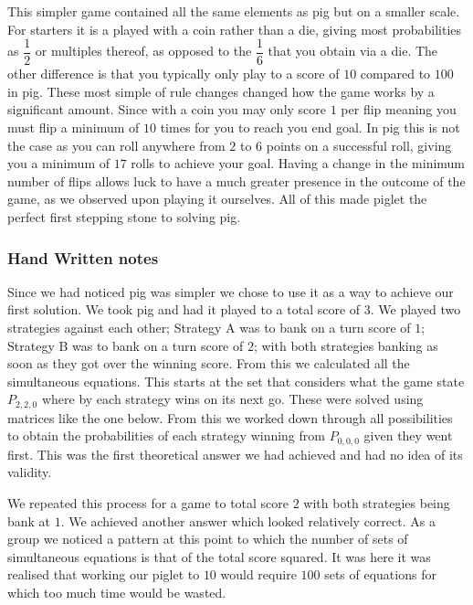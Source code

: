 \documentclass[a4paper,titlepage]{article}
\begin{document}
This simpler game contained all the same elements as pig but on a smaller scale. For starters it is a played with a coin rather than a die,
giving most probabilities as $\dfrac{1}{2}$ or multiples thereof, as opposed to the $\dfrac{1}{6}$ that you obtain via a die.
The other difference is that you typically only play to a score of $10$ compared to $100$ in pig.
These most simple of rule changes changed how the game works by a significant amount. %
Since with a coin you may only score $1$ per flip meaning you must flip a minimum of $10$ times for you to reach you end goal. In pig this is not the case as you can roll anywhere from $2$ to $6$ points on a successful roll, giving you a minimum of $17$ rolls to achieve your goal. Having a change in the minimum number of flips allows luck to have a much greater presence in the outcome of the game, as we observed upon playing it ourselves. All of this made piglet the perfect first stepping stone to solving pig.

\subsubsection{Hand Written notes}
Since we had noticed pig was simpler we chose to use it as a way to achieve our first solution. We took pig and had it played to a total score of $3$. We played two strategies against each other; Strategy A was to bank on a turn score of $1$; Strategy B was to bank on a turn score of $2$; with both strategies banking as soon as they got over the winning score. From this we calculated all the simultaneous equations. This starts at the set that considers what the game state $P_{2,2,0}$ where by each strategy wins on its next go. These were solved using matrices like the one below.
From this we worked down through all possibilities to obtain the probabilities of each strategy winning from $P_{0,0,0}$ given they went first. This was the first theoretical answer we had achieved and had no idea of its validity.

We repeated this process for a game to total score $2$ with both strategies being bank at $1$. We achieved another answer which looked relatively correct. As a group we noticed a pattern at this point to which the number of sets of simultaneous equations is that of the total score squared. It was here it was realised that working our piglet to $10$ would require $100$ sets of equations for which too much time would be wasted.
\end{document}

